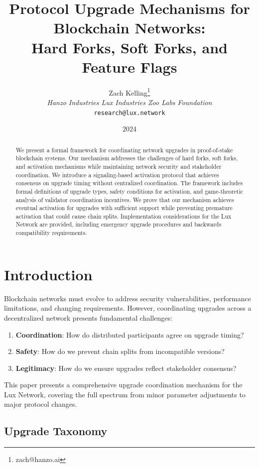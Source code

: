 \documentclass[11pt,a4paper]{article}
\title{Protocol Upgrade Mechanisms for Blockchain Networks:\\
Hard Forks, Soft Forks, and Feature Flags}
\author{Zach Kelling\thanks{zach@hanzo.ai} \\ \textit{Hanzo Industries \quad Lux Industries \quad Zoo Labs Foundation} \\ \texttt{research@lux.network}}
\date{2024}
\theoremstyle{definition}
\theoremstyle{remark}
\begin{document}
\maketitle

\begin{abstract}
We present a formal framework for coordinating network upgrades in proof-of-stake blockchain systems. Our mechanism addresses the challenges of hard forks, soft forks, and activation mechanisms while maintaining network security and stakeholder coordination. We introduce a signaling-based activation protocol that achieves consensus on upgrade timing without centralized coordination. The framework includes formal definitions of upgrade types, safety conditions for activation, and game-theoretic analysis of validator coordination incentives. We prove that our mechanism achieves eventual activation for upgrades with sufficient support while preventing premature activation that could cause chain splits. Implementation considerations for the Lux Network are provided, including emergency upgrade procedures and backwards compatibility requirements.
\end{abstract}

\section{Introduction}

Blockchain networks must evolve to address security vulnerabilities, performance limitations, and changing requirements. However, coordinating upgrades across a decentralized network presents fundamental challenges:

\begin{enumerate}[label=(\roman*)]
    \item \textbf{Coordination}: How do distributed participants agree on upgrade timing?
    \item \textbf{Safety}: How do we prevent chain splits from incompatible versions?
    \item \textbf{Legitimacy}: How do we ensure upgrades reflect stakeholder consensus?
\end{enumerate}

This paper presents a comprehensive upgrade coordination mechanism for the Lux Network, covering the full spectrum from minor parameter adjustments to major protocol changes.

\subsection{Upgrade Taxonomy}
\end{document}
